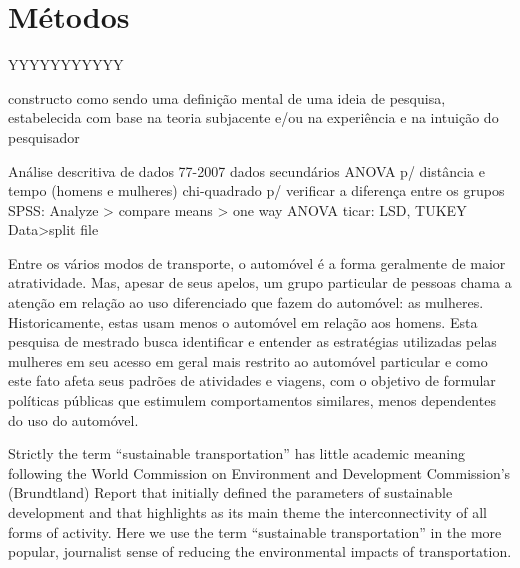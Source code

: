 \chapter{Métodos}\label{chap:metodo}

YYYYYYYYYYY

constructo como sendo uma definição mental de uma ideia de pesquisa, estabelecida com base na teoria subjacente e/ou na experiência e na intuição do pesquisador

Análise descritiva de dados 77-2007
dados secundários
ANOVA p/ distância e tempo (homens e mulheres)
chi-quadrado p/ verificar a diferença entre os grupos
SPSS: Analyze > compare means > one way ANOVA
ticar: LSD, TUKEY
Data>split file

Entre os vários modos de transporte, o automóvel é a forma geralmente de maior atratividade. Mas, apesar de seus apelos, um grupo particular de pessoas chama a atenção em relação ao uso diferenciado que fazem do automóvel: as mulheres. Historicamente, estas usam menos o automóvel em relação aos homens. Esta pesquisa de mestrado busca identificar e entender as estratégias utilizadas pelas mulheres em seu acesso em geral mais restrito ao automóvel particular e como este fato afeta seus padrões de atividades e viagens, com o objetivo de formular políticas públicas que estimulem comportamentos similares, menos dependentes  do uso do automóvel.


Strictly the term “sustainable transportation” has little academic meaning
following the World Commission on Environment and Development Commission’s
(Brundtland) Report that initially defined the parameters of sustainable
development and that highlights as its main theme the interconnectivity of
all forms of activity. Here we use the term “sustainable transportation” in
the more popular, journalist sense of reducing the environmental impacts of
transportation.